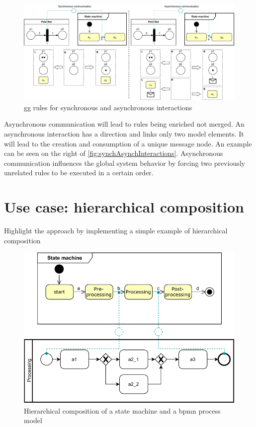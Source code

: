 \documentclass[a4paper]{easychair}
\begin{document}
\begin{figure}[h]
    \centering
    \includegraphics[width=1\textwidth]{images/synch_asynch.pdf}
    \caption{\gls{gg} rules for synchronous and asynchronous interactions}
    \label{fig:synchAsynchInteractions}
\end{figure}

Asynchronous communication will lead to rules being enriched not merged.
An asynchronous interaction has a direction and links only two model elements.
It will lead to the creation and consumption of a unique message node. 
An example can be seen on the right of \autoref{fig:synchAsynchInteractions}.
Asynchronous communication influences the global system behavior by forcing two previously unrelated rules to be executed in a certain order.




\section{Use case: hierarchical composition}
Highlight the approach by implementing a simple example of hierarchical composition

\begin{figure}[h]
    \centering
    \includegraphics[width=.5\textwidth]{images/usecase.pdf}
    \caption{Hierarchical composition of a state machine and a \gls{bpmn} process model}
    \label{fig:useCase}
\end{figure}
\end{document}
